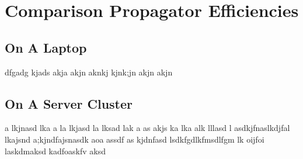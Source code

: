 \section{Comparison Propagator Efficiencies}
\subsection{On A Laptop}
dfgadg kjads akja akjn aknkj kjnk;jn akjn akjn 

\subsection{On A Server Cluster}
a lkjnasd lka a la lkjasd la lksad lak a
as akjs ka lka alk lllasd l
asdkjfnaslkdjfal lkajsnd a;kjndfajsnasdk aoa 
assdf as kjdnfasd
lsdkfgdlkfmsdlfgm lk oijfoi  laskdmaksd kadfoaskfv aksd

